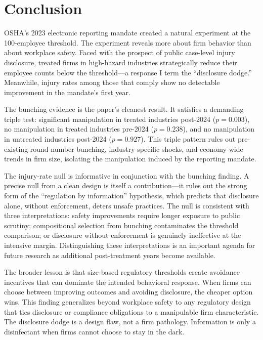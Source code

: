 \documentclass[12pt]{article}
\begin{document}
\section{Conclusion}\label{sec:conclusion}

OSHA's 2023 electronic reporting mandate created a natural experiment at the 100-employee threshold. The experiment reveals more about firm behavior than about workplace safety. Faced with the prospect of public case-level injury disclosure, treated firms in high-hazard industries strategically reduce their employee counts below the threshold---a response I term the ``disclosure dodge.'' Meanwhile, injury rates among those that comply show no detectable improvement in the mandate's first year.

The bunching evidence is the paper's cleanest result. It satisfies a demanding triple test: significant manipulation in treated industries post-2024 ($p = 0.003$), no manipulation in treated industries pre-2024 ($p = 0.238$), and no manipulation in untreated industries post-2024 ($p = 0.927$). This triple pattern rules out pre-existing round-number bunching, industry-specific shocks, and economy-wide trends in firm size, isolating the manipulation induced by the reporting mandate.

The injury-rate null is informative in conjunction with the bunching finding. A precise null from a clean design is itself a contribution---it rules out the strong form of the ``regulation by information'' hypothesis, which predicts that disclosure alone, without enforcement, deters unsafe practices. The null is consistent with three interpretations: safety improvements require longer exposure to public scrutiny; compositional selection from bunching contaminates the threshold comparison; or disclosure without enforcement is genuinely ineffective at the intensive margin. Distinguishing these interpretations is an important agenda for future research as additional post-treatment years become available.

The broader lesson is that size-based regulatory thresholds create avoidance incentives that can dominate the intended behavioral response. When firms can choose between improving outcomes and avoiding disclosure, the cheaper option wins. This finding generalizes beyond workplace safety to any regulatory design that ties disclosure or compliance obligations to a manipulable firm characteristic. The disclosure dodge is a design flaw, not a firm pathology. Information is only a disinfectant when firms cannot choose to stay in the dark.
\end{document}
